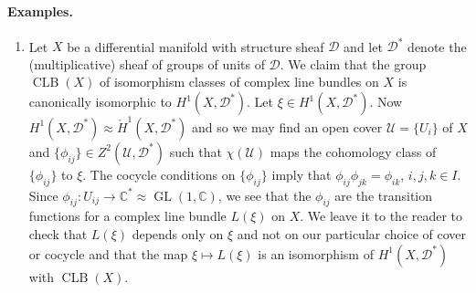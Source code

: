 \paragraph{Examples.}
\begin{enumerate}[start=10]
\item Let $X$ be a differential manifold with structure sheaf $\mathscr D$ and let $\mathscr D^*$ denote the (multiplicative) sheaf of groups of units of $\mathscr D$. We claim that the group $\operatorname{CLB}(X)$ of isomorphism classes of complex line bundles on $X$ is canonically isomorphic to $H^1(X,\mathscr D^*)$. Let $\xi\in H^1(X,\mathscr D^*)$. Now $H^1(X,\mathscr D^*)\approx\check H^1(X,\mathscr D^*)$ and so we may find an open cover $\mathcal U=\{U_i\}$ of $X$ and $\{\phi_{ij}\}\in Z^2(\mathcal U,\mathscr D^*)$ such that $\chi(\mathcal U)$ maps the cohomology class of $\{\phi_{ij}\}$ to $\xi$. The cocycle conditions on $\{\phi_{ij}\}$ imply that $\phi_{ij}\phi_{jk}=\phi_{ik}$, $i,j,k\in I$. Since $\phi_{ij}:U_{ij}\to\mathbb C^*\approx\operatorname{GL}(1,\mathbb C)$, we see that the $\phi_{ij}$ are the transition functions for a complex line bundle $L(\xi)$ on $X$. We leave it to the reader to check that $L(\xi)$ depends only on $\xi$ and not on our particular choice of cover or cocycle and that the map $\xi\mapsto L(\xi)$ is an isomorphism of $H^1(X,\mathscr D^*)$ with $\operatorname{CLB}(X)$.


\end{enumerate}
